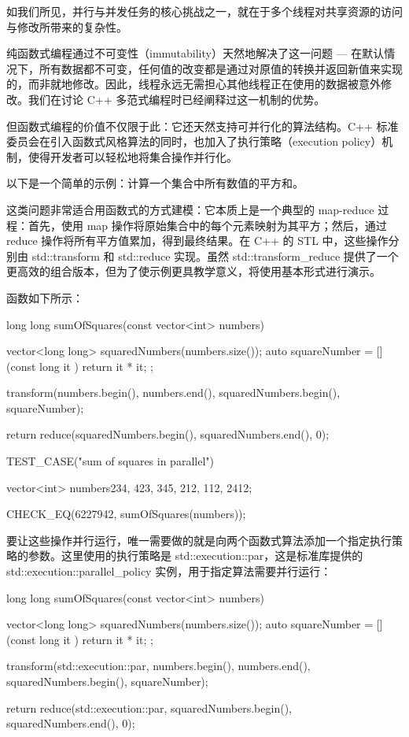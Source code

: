 

如我们所见，并行与并发任务的核心挑战之一，就在于多个线程对共享资源的访问与修改所带来的复杂性。

纯函数式编程通过不可变性（immutability）天然地解决了这一问题 --- 在默认情况下，所有数据都不可变，任何值的改变都是通过对原值的转换并返回新值来实现的，而非就地修改。因此，线程永远无需担心其他线程正在使用的数据被意外修改。我们在讨论 C++ 多范式编程时已经阐释过这一机制的优势。

但函数式编程的价值不仅限于此：它还天然支持可并行化的算法结构。C++ 标准委员会在引入函数式风格算法的同时，也加入了执行策略（execution policy）机制，使得开发者可以轻松地将集合操作并行化。

以下是一个简单的示例：计算一个集合中所有数值的平方和。

这类问题非常适合用函数式的方式建模：它本质上是一个典型的 map-reduce 过程：首先，使用 map 操作将原始集合中的每个元素映射为其平方；然后，通过 reduce 操作将所有平方值累加，得到最终结果。在 C++ 的 STL 中，这些操作分别由 std::transform 和 std::reduce 实现。虽然 std::transform\_reduce 提供了一个更高效的组合版本，但为了使示例更具教学意义，将使用基本形式进行演示。

函数如下所示：

\begin{cpp}
long long sumOfSquares(const vector<int> numbers){
  vector<long long> squaredNumbers(numbers.size());
  auto squareNumber = [](const long it ){ return it * it; };

  transform(numbers.begin(), numbers.end(), squaredNumbers.begin(), squareNumber);

  return reduce(squaredNumbers.begin(), squaredNumbers.end(), 0);
}

TEST_CASE("sum of squares in parallel") {
  vector<int> numbers{234, 423, 345, 212, 112, 2412};

  CHECK_EQ(6227942, sumOfSquares(numbers));
}
\end{cpp}

要让这些操作并行运行，唯一需要做的就是向两个函数式算法添加一个指定执行策略的参数。这里使用的执行策略是 std::execution::par，这是标准库提供的 std::execution::parallel\_policy 实例，用于指定算法需要并行运行：

\begin{cpp}
long long sumOfSquares(const vector<int> numbers){
  vector<long long> squaredNumbers(numbers.size());
  auto squareNumber = [](const long it ){ return it * it; };

  transform(std::execution::par, numbers.begin(), numbers.end(), squaredNumbers.begin(), squareNumber);

  return reduce(std::execution::par, squaredNumbers.begin(), squaredNumbers.end(), 0);
}
\end{cpp}

